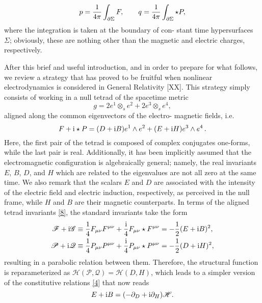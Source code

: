 \begin{equation}
  p=\frac{1}{4\pi }\int_{\partial\Sigma}F,\qquad q=\frac{1}{4\pi }\int_{\partial\Sigma}\star P, 
\end{equation}
where the integration is taken at the boundary of con-
stant time hypersurfaces $\Sigma $; obviously, these are nothing other than the magnetic and electric charges, respectively.

After this brief and useful introduction, and in order to prepare for what follows, we review a strategy that has proved to be fruitful when nonlinear electrodynamics is considered in General Relativity [XX]. This strategy simply consists of working in a null tetrad of the spacetime metric
\begin{equation}\label{7}
  g=2e^1\otimes_s e^2+2e^3\otimes_s e^4, 
\end{equation}
aligned along the common eigenvectors of the electro-
magnetic fields, i.e.
\begin{equation}\label{8}
  F+\mathrm{i}  \star P=(D+\mathrm{i} B)e^1\wedge e^2+(E+\mathrm{i} H)e^3\wedge e^4\,  .
\end{equation}
Here, the first pair of the tetrad is composed of complex conjugates one-forms, while the last pair is real. Additionally, it has been implicitly assumed that the electromagnetic configuration is algebraically general; namely, the real invariants $E$, $B$, $D$, and $H$ which are related to the eigenvalues are not all zero at the same time. We also remark that the scalars $E$ and $D$ are associated with the intensity of the electric field and electric induction, respectively, as perceived in the null frame, while $H$ and $B$ are their magnetic counterparts. In terms of the aligned tetrad invariants \eqref{8}, the standard invariants take the form
\begin{subequations}\label{9}
	\begin{align}
  \mathscr{F}+\mathrm{i} \mathscr{G}&\equiv \frac{1}{4}F_{\mu\nu }F^{\mu\nu }+\frac{\mathrm{i} }{4}F_{\mu\nu}\star F^{\mu\nu }=-\frac{1}{2}(E+\mathrm{i} B)^2,\\
  \mathscr{P}+\mathrm{i} \mathscr{Q}&\equiv \frac{1}{4}P_{\mu\nu }P^{\mu\nu }+\frac{\mathrm{i} }{4}P_{\mu\nu}\star P^{\mu\nu }=-\frac{1}{2}(D+\mathrm{i} H)^2,
\end{align}
\end{subequations}
resulting in a parabolic relation between them. Therefore, the structural function is reparameterized as $\mathscr{H}(\mathscr{P},\mathscr{Q})=\mathscr{H}(D,H)$, which leads to a simpler version of the constitutive relations \eqref{4} that now reads
\begin{equation}\label{10}
  E+\mathrm{i} B=(-\partial_D+\mathrm{i} \partial_H)\mathscr{H}.
\end{equation}
